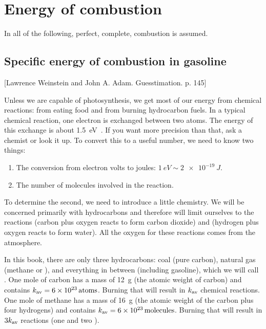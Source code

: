 \chapter*{Energy of combustion}
%
In all of the following, perfect, complete, combustion is assumed.


\section*{Specific energy of combustion in gasoline}
%
[Lawrence Weinstein and John A. Adam. Guesstimation. p. 145]

Unless we are capable of photosynthesis, we get most of our energy from chemical reactions: from eating food and from burning hydrocarbon fuels. In a typical chemical reaction, one electron is exchanged between two atoms. The energy of this exchange is about \SI{1.5}{eV}~. If you want more precision than that, ask a chemist or look it up. To convert this to a useful number, we need to know two things:
%
\begin{enumerate}
%
\item The conversion from electron volts to joules: $\SI{1}{eV}\sim \SI{2e-19}{J}$.
%
\item The number of molecules involved in the reaction.
%
\end{enumerate}

To determine the second, we need to introduce a little chemistry. We will be concerned primarily with hydrocarbons and therefore will limit ourselves to the reactions  (carbon plus oxygen reacts to form carbon dioxide) and  (hydrogen plus oxygen reacts to form water). All the oxygen for these reactions comes from the atmosphere.

In this book, there are only three hydrocarbons: coal (pure carbon), natural gas (methane or ), and everything in between (including gasoline), which we will call . One mole of carbon has a mass of \SI{12}{g} (the atomic weight of carbon) and contains $k_\text{av} = \SI{6E23}{atoms}$. Burning that will result in $k_\text{av}$ chemical reactions. One mole of methane has a mass of \SI{16}{g} (the atomic weight of the carbon plus four hydrogens) and contains $k_\text{av} = \SI{6E23}{molecules}$. Burning that will result in $3k_\text{av}$ reactions (one  and two ).

